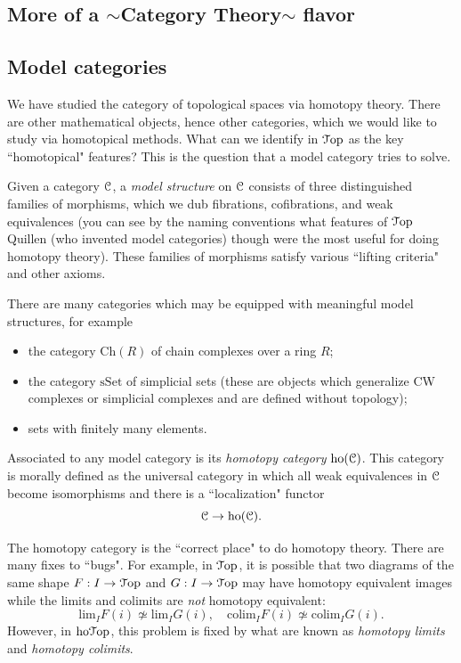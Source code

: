 \documentclass[10pt]{amsart}
\newcommand{\euscr}[1]{\EuScript{#1}}
\theoremstyle{definition}
\newcommand{\cdef}[1]{\textcolor{Bittersweet}{#1}}
\begin{document}
\subsection{More of a $\sim$Category Theory$\sim$ flavor}
\subsection*{Model categories}
We have studied the category of topological spaces via homotopy theory. There are other mathematical objects, hence other categories, which we would like to study via homotopical methods. What can we identify in $\euscr{T}\text{op}$ as the key ``homotopical" features? This is the question that a model category tries to solve.

Given a category $\euscr{C}$, a \cdef{\emph{model structure}} on $\euscr{C}$ consists of three distinguished families of morphisms, which we dub fibrations, cofibrations, and weak equivalences (you can see by the naming conventions what features of $\euscr{T}\text{op}$ Quillen (who invented model categories) though were the most useful for doing homotopy theory). These families of morphisms satisfy various ``lifting criteria" and other axioms.

There are many categories which may be equipped with meaningful model structures, for example
\begin{itemize}
    \item the category $\text{Ch}(R)$ of chain complexes over a ring $R$;
    \item the category $\mathrm{sSet}$ of simplicial sets (these are objects which generalize CW complexes or simplicial complexes and are defined without topology);
    \item sets with finitely many elements.
\end{itemize}

Associated to any model category is its \cdef{\emph{homotopy category}} $\text{ho}(\euscr{C})$. This category is morally defined as the universal category in which all weak equivalences in $\euscr{C}$ become isomorphisms and there is a ``localization" functor
\[
\euscr{C} \to \text{ho}(\euscr{C}).
\]

The homotopy category is the ``correct place" to do homotopy theory. There are many fixes to ``bugs". For example, in $\euscr{T}\mathrm{op}$, it is possible that two diagrams of the same shape $F:I \to \euscr{T}\mathrm{op}$ and $G:I \to \euscr{T}\mathrm{op}$ may have homotopy equivalent images while the limits and colimits are \emph{not} homotopy equivalent:
\[
\text{lim}_IF(i) \not\simeq \text{lim}_IG(i), \quad \text{colim}_IF(i) \not\simeq \text{colim}_IG(i).
\]
However, in $\text{ho}\euscr{T}\mathrm{op}$, this problem is fixed by what are known as \cdef{\emph{homotopy limits}} and \cdef{\emph{homotopy colimits}}.
\end{document}
